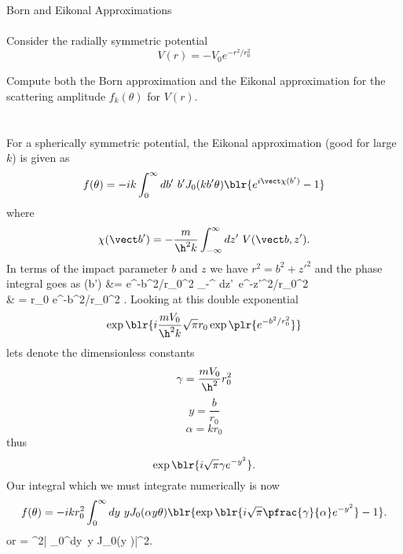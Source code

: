 \documentclass[10pt,letterpaper]{article}
\begin{document}
	\item{Born and Eikonal Approximations}
	\\ \\
	Consider the radially symmetric potential 
	\[
		V(r) = -V_0e^{-r^2/r_0^2}
	\]
	\benum
	\item 
	Compute both the Born approximation and the Eikonal approximation for the scattering amplitude
	$f_k(\theta)$ for $V(r)$.
	\\
	\\
	\\
	For a spherically symmetric potential, the Eikonal approximation (good for large $k$) is given as
	\[
		f(\theta) = -ik\int_0^\infty db'\ b' J_0(kb'\theta)\blr{e^{i\vect\chi(b')}-1}
	\]
	where
	\[
		\chi(\vect b') = -\frac{m}{\h^2 k} \int_{-\infty}^{\infty} dz'\ V(\vect b,z').
	\]
	In terms of the impact parameter $b$ and $z$ we have $r^2 = b^2+z'^2$ and the phase integral goes as
	\ba
		\chi(b') &= e^{-b^2/r_0^2} \int_{-\infty}^{\infty} dz'\ e^{-z'^2/r_0^2} \\
		& = \sqrt\pi r_0 e^{-b^2/r_0^2} .
	\ea
	Looking at this double exponential
	\[
		\exp\blr{i\frac{mV_0}{\h^2 k}\sqrt\pi r_0\exp\plr{ e^{-b^2/r_0^2}}}
	\] 
	lets denote the dimensionless constants
	\[
		\gamma = \frac{mV_0}{\h^2}r_0^2
	\]
	\[
		y = \frac{b}{r_0} 
	\]
	\[
		\alpha = kr_0
	\]
	thus
	\[
		\exp\blr{i\sqrt\pi\gamma e^{-y^2}}.
	\]
	Our integral which we must integrate numerically is now
	\[
		f(\theta) = -ikr_0^2 \int_0^\infty dy\ y J_0(\alpha y \theta)\blr{\exp\blr{i\sqrt\pi\pfrac{\gamma}{\alpha} e^{-y^2}}-1}.
	\]
	or
	\be\label{3}
		 = \alpha^2\left| 
		\int_0^\infty dy\ y J_0(\alpha y \theta)\right|^2.
	\ee
	\\
	\\
\end{document}
